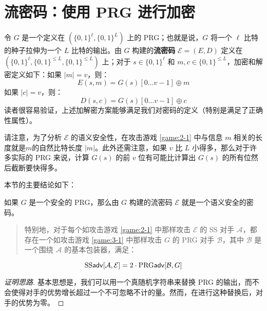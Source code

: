 \section{流密码：使用 PRG 进行加密}\label{sec:3-2}

令 $G$ 是一个定义在 $(\{0,1\}^\ell,\{0,1\}^L)$ 上的 PRG；也就是说，$G$ 将一个 $\ell$ 比特的种子拉伸为一个 $L$ 比特的输出。由 $G$ 构建的\textbf{流密码} $\mathcal E=(E,D)$ 定义在 $(\{0,1\}^\ell,\{0,1\}^{\leq L},\{0,1\}^{\leq L})$ 上；对于 $s\in\{0,1\}^\ell$ 和 $m,c\in\{0,1\}^{\leq L}$，加密和解密定义如下：如果 $|m|=v$，则：
\[
E(s,m)=G(s)[0\dots v-1]\oplus m
\]
如果 $|c| = v$，则：
\[
D(s,c)=G(s)[0\dots v-1]\oplus c
\]
读者很容易验证，上述加解密方案能够满足我们对密码的定义（特别是满足了正确性属性）。

请注意，为了分析 $\mathcal E$ 的语义安全性，在攻击游戏 \ref{game:2-1} 中与信息 $m$ 相关的长度就是$m$的自然比特长度 $|m|$。此外还需注意，如果 $v$ 比 $L$ 小得多，那么对于许多实际的 PRG 来说，计算 $G(s)$ 的前 $v$ 位有可能比计算出 $G(s)$ 的所有位然后截断要快得多。

本节的主要结论如下：

\begin{theorem}\label{theo:3-1}
如果 $G$ 是一个安全的 PRG，那么由 $G$ 构建的流密码 $\mathcal E$ 就是一个语义安全的密码。
\begin{quote}
特别地，对于每个如攻击游戏 \ref{game:2-1} 中那样攻击 $\mathcal E$ 的 SS 对手 $\mathcal A$，都存在一个如攻击游戏 \ref{game:3-1} 中那样攻击 $G$ 的 PRG 对手 $\mathcal B$，其中 $\mathcal B$ 是一个围绕 $\mathcal A$ 的基本包装器，满足：
\end{quote}
\begin{equation}\label{eq:3-2}
{\rm SS\mathsf{adv}}[\mathcal{A},\mathcal{E}]=2\cdot{\rm PRG\mathsf{adv}}[\mathcal{B},G]
\end{equation}
\end{theorem}

\begin{proof}[证明思路]
基本思想是，我们可以用一个真随机字符串来替换 PRG 的输出，而不会使得对手的优势增长超过一个不可忽略不计的量。然而，在进行这种替换后，对手的优势为零。
\end{proof}


